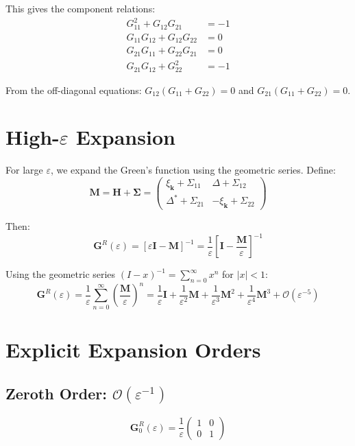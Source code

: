 \documentclass[12pt]{article}
\begin{document}
This gives the component relations:
\begin{align}
G_{11}^2 + G_{12}G_{21} &= -1 \\
G_{11}G_{12} + G_{12}G_{22} &= 0 \\
G_{21}G_{11} + G_{22}G_{21} &= 0 \\
G_{21}G_{12} + G_{22}^2 &= -1
\end{align}

From the off-diagonal equations: $G_{12}(G_{11} + G_{22}) = 0$ and $G_{21}(G_{11} + G_{22}) = 0$.

\section{High-$\varepsilon$ Expansion}

For large $\varepsilon$, we expand the Green's function using the geometric series. Define:
\begin{equation}
\mathbf{M} = \mathbf{H} + \mathbf{\Sigma} = \begin{pmatrix}
\xi_{\mathbf{k}} + \Sigma_{11} & \Delta + \Sigma_{12} \\
\Delta^* + \Sigma_{21} & -\xi_{\mathbf{k}} + \Sigma_{22}
\end{pmatrix}
\end{equation}

Then:
\begin{equation}
\mathbf{G}^R(\varepsilon) = \left[\varepsilon \mathbf{I} - \mathbf{M}\right]^{-1} = \frac{1}{\varepsilon}\left[\mathbf{I} - \frac{\mathbf{M}}{\varepsilon}\right]^{-1}
\end{equation}

Using the geometric series $(I - x)^{-1} = \sum_{n=0}^{\infty} x^n$ for $|x| < 1$:
\begin{equation}
\mathbf{G}^R(\varepsilon) = \frac{1}{\varepsilon} \sum_{n=0}^{\infty} \left(\frac{\mathbf{M}}{\varepsilon}\right)^n = \frac{1}{\varepsilon}\mathbf{I} + \frac{1}{\varepsilon^2}\mathbf{M} + \frac{1}{\varepsilon^3}\mathbf{M}^2 + \frac{1}{\varepsilon^4}\mathbf{M}^3 + \mathcal{O}(\varepsilon^{-5})
\end{equation}

\section{Explicit Expansion Orders}

\subsection{Zeroth Order: $\mathcal{O}(\varepsilon^{-1})$}
\begin{equation}
\mathbf{G}^R_0(\varepsilon) = \frac{1}{\varepsilon} \begin{pmatrix}
1 & 0 \\
0 & 1
\end{pmatrix}
\end{equation}
\end{document}
